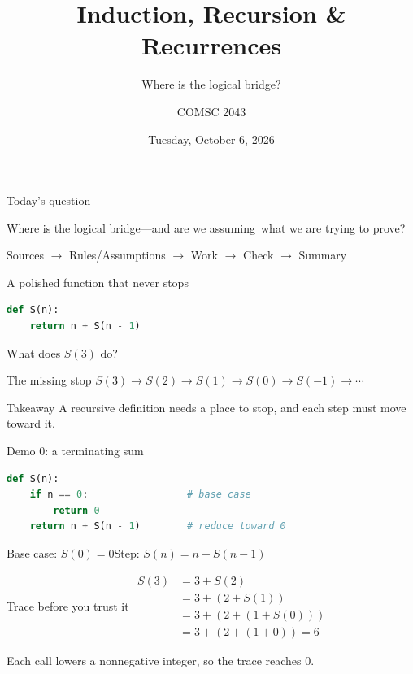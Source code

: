\documentclass[aspectratio=169,10pt]{beamer}
\title{Induction, Recursion \& Recurrences}
\subtitle{Where is the logical bridge?}
\author{COMSC 2043}
\date{Tuesday, October 6, 2026}
\begin{document}
\begin{frame}
  \titlepage
\end{frame}

\begin{frame}{Today's question}
  \begin{center}
    \LARGE Where is the logical bridge---and are we assuming\
    what we are trying to prove?
  \end{center}
  \vfill
  \centering\large Sources $\to$ Rules/Assumptions $\to$ Work $\to$ Check $\to$ Summary
\end{frame}

\begin{frame}[fragile]{A polished function that never stops}
\begin{lstlisting}[language=Python]
def S(n):
    return n + S(n - 1)
\end{lstlisting}
  \Large What does $S(3)$ do?
\end{frame}

\begin{frame}{The missing stop}
  \centering\Large
  $S(3)\to S(2)\to S(1)\to S(0)\to S(-1)\to\cdots$

  \vfill
  \begin{block}{Takeaway}
    A recursive definition needs a place to stop, and each step must move toward it.
  \end{block}
\end{frame}

\begin{frame}[fragile]{Demo 0: a terminating sum}
\begin{lstlisting}[language=Python]
def S(n):
    if n == 0:                 # base case
        return 0
    return n + S(n - 1)        # reduce toward 0
\end{lstlisting}
  \centering\Large Base case: $S(0)=0$\qquad Step: $S(n)=n+S(n-1)$
\end{frame}

\begin{frame}{Trace before you trust it}
  \centering\Large
  $\begin{aligned}
  S(3)&=3+S(2)\\
      &=3+(2+S(1))\\
      &=3+(2+(1+S(0)))\\
      &=3+(2+(1+0))=6
  \end{aligned}$

  \vfill Each call lowers a nonnegative integer, so the trace reaches $0$.
\end{frame}
\end{document}
